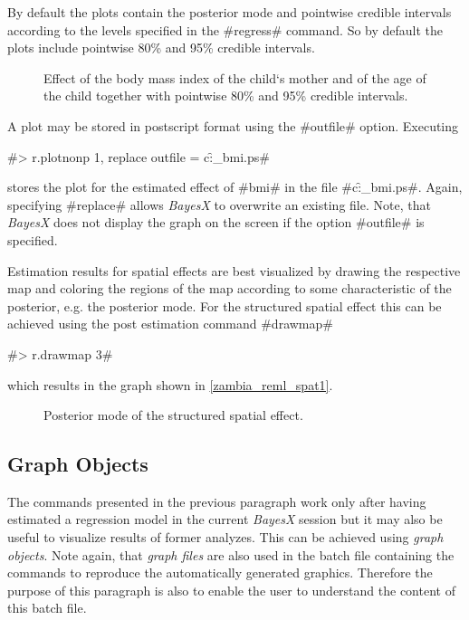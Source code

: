 \documentclass[11pt,a4paper,twoside]{bayesxreport}
\begin{document}
By default the plots contain the posterior mode and pointwise
credible intervals according to the levels specified in the
#regress# command. So by default the plots include pointwise 80\%
and 95\% credible intervals.

\begin{figure}[ht]
\begin{center}
{\it\caption{Effect of the body mass index of the child`s mother and
of the age of the child together with pointwise 80\% and 95\%
credible intervals. \label{zambia_reml_bmi1}}}
\end{center}
\end{figure}

A plot may be stored in postscript format using the #outfile#
option. Executing

#> r.plotnonp 1, replace outfile = c:\data\f_bmi.ps#

stores the plot for the estimated effect of #bmi# in the file
#c:\data\f_bmi.ps#. Again, specifying #replace# allows {\it BayesX}
to overwrite an existing file. Note, that {\it BayesX} does not
display the graph on the screen if the option #outfile# is
specified.

Estimation results for spatial effects are best visualized by
drawing the respective map and coloring the regions of the map
according to some characteristic of the posterior, e.g. the
posterior mode. For the structured spatial effect this can be
achieved using the post estimation command #drawmap#

#> r.drawmap 3#

which results in the graph shown in \autoref{zambia_reml_spat1}.

\begin{figure}[ht]
\begin{center}
{\it\caption{Posterior mode of the structured spatial
effect.\label{zambia_reml_spat1}}}
\end{center}
\end{figure}


\subsection{Graph Objects}

The commands presented in the previous paragraph work only after
having estimated a regression model in the current {\em BayesX}
session but it may also be useful to visualize results of former
analyzes. This can be achieved using {\em graph objects}. Note
again, that {\em graph files} are also used in the batch file
containing the commands to reproduce the automatically generated
graphics. Therefore the purpose of this paragraph is also to enable
the user to understand the content of this batch file.
\end{document}
